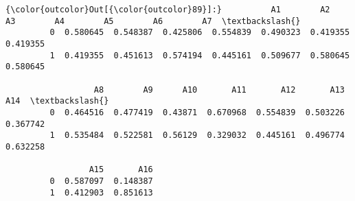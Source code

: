 \documentclass[11pt]{article}
\begin{document}
\begin{Verbatim}[commandchars=\\\{\}]
{\color{outcolor}Out[{\color{outcolor}89}]:}          A1        A2        A3        A4        A5        A6        A7  \textbackslash{}
         0  0.580645  0.548387  0.425806  0.554839  0.490323  0.419355  0.419355   
         1  0.419355  0.451613  0.574194  0.445161  0.509677  0.580645  0.580645   
         
                  A8        A9      A10       A11       A12       A13       A14  \textbackslash{}
         0  0.464516  0.477419  0.43871  0.670968  0.554839  0.503226  0.367742   
         1  0.535484  0.522581  0.56129  0.329032  0.445161  0.496774  0.632258   
         
                 A15       A16  
         0  0.587097  0.148387  
         1  0.412903  0.851613  
\end{Verbatim}
            
\end{document}
